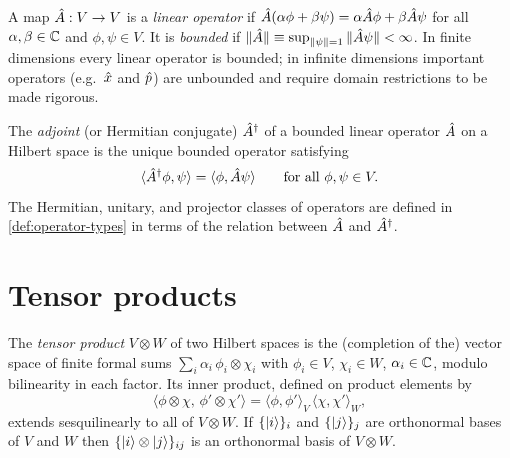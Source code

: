 \begin{definition}
\label{def:linear-op}
A map $\hat{A}:V\to V$ is a \emph{linear operator} if
$\hat{A}(\alpha\phi+\beta\psi)=\alpha\hat{A}\phi+\beta\hat{A}\psi$ for
all $\alpha,\beta\in\mathbb{C}$ and $\phi,\psi\in V$. It is \emph{bounded}
if $\|\hat{A}\|\equiv\sup_{\|\psi\|=1}\|\hat{A}\psi\|<\infty$. In
finite dimensions every linear operator is bounded; in infinite
dimensions important operators (e.g.\ $\hat{x}$ and $\hat{p}$) are
unbounded and require domain restrictions to be made rigorous.
\end{definition}

\begin{definition}[Adjoint]
\label{def:adjoint}
The \emph{adjoint} (or Hermitian conjugate) $\hat{A}^\dagger$ of a
bounded linear operator $\hat{A}$ on a Hilbert space is the unique
bounded operator satisfying
\begin{equation}
\langle\hat{A}^\dagger\phi,\psi\rangle = \langle\phi,\hat{A}\psi\rangle
\qquad\text{for all}\ \phi,\psi\in V.
\end{equation}
The Hermitian, unitary, and projector classes of operators are
defined in \cref{def:operator-types} in terms of the relation
between $\hat{A}$ and $\hat{A}^\dagger$.
\end{definition}

\section{Tensor products}
\label{app:tensor}

\begin{definition}
\label{def:tensor-product}
The \emph{tensor product} $V\otimes W$ of two Hilbert spaces is
the (completion of the) vector space of finite formal sums
$\sum_i \alpha_i\,\phi_i\otimes\chi_i$ with $\phi_i\in V$,
$\chi_i\in W$, $\alpha_i\in\mathbb{C}$, modulo bilinearity in each
factor. Its inner product, defined on product elements by
\begin{equation}
\langle\phi\otimes\chi,\,\phi'\otimes\chi'\rangle
= \langle\phi,\phi'\rangle_V\,\langle\chi,\chi'\rangle_W,
\end{equation}
extends sesquilinearly to all of $V\otimes W$. If
$\{\ket{i}\}_i$ and $\{\ket{j}\}_j$ are orthonormal bases of $V$
and $W$ then $\{\ket{i}\otimes\ket{j}\}_{ij}$ is an orthonormal
basis of $V\otimes W$.
\end{definition}
